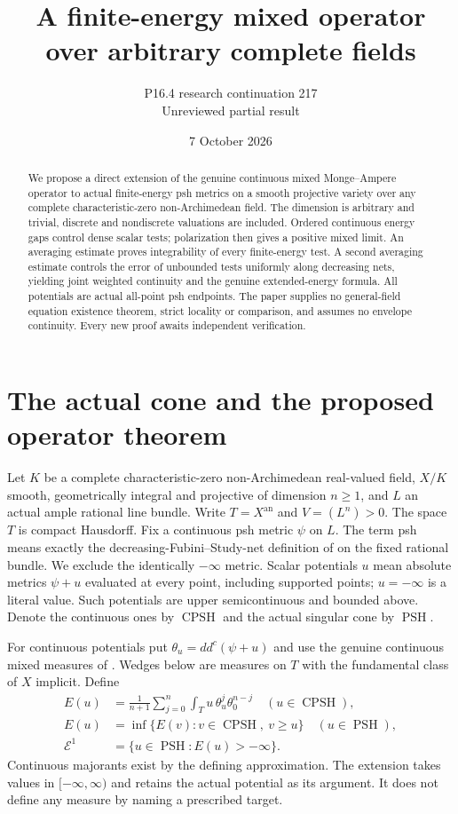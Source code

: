 \documentclass[11pt]{article}
\title{A finite-energy mixed operator\\over arbitrary complete fields}
\author{P16.4 research continuation 217\\Unreviewed partial result}
\date{7 October 2026}
\newcommand{\PSH}{\operatorname{PSH}}
\newcommand{\ddc}{dd^c}
\newcommand{\an}{\mathrm{an}}
\newcommand{\E}{\mathcal E}
\newcommand{\CPSH}{\operatorname{CPSH}}
\begin{document}
\maketitle
\begin{abstract}
We propose a direct extension of the genuine continuous mixed
Monge--Ampere operator to actual finite-energy psh metrics on a smooth
projective variety over any complete characteristic-zero
non-Archimedean field. The dimension is arbitrary and trivial,
discrete and nondiscrete valuations are included. Ordered continuous
energy gaps control dense scalar tests; polarization then gives a
positive mixed limit. An averaging estimate proves integrability of
every finite-energy test. A second averaging estimate controls the
error of unbounded tests uniformly along decreasing nets, yielding
joint weighted continuity and the genuine extended-energy formula.
All potentials are actual all-point psh endpoints. The paper supplies
no general-field equation existence theorem, strict locality or
comparison, and assumes no envelope continuity. Every new proof
awaits independent verification.
\end{abstract}

\section{The actual cone and the proposed operator theorem}

Let $K$ be a complete characteristic-zero non-Archimedean real-valued
field, $X/K$ smooth, geometrically integral and projective of dimension
$n\geq1$, and $L$ an actual ample rational line bundle. Write
$T=X^{\an}$ and $V=(L^n)>0$. The space $T$ is compact Hausdorff.
Fix a continuous psh metric $\psi$ on $L$. The term psh means exactly
the decreasing-Fubini--Study-net definition of
\cite[Definition 7.2]{BE} on the fixed rational bundle. We exclude the
identically $-\infty$ metric. Scalar potentials $u$ mean absolute
metrics $\psi+u$ evaluated at every point, including supported points;
$u=-\infty$ is a literal value. Such potentials are upper
semicontinuous and bounded above. Denote the continuous ones by
$\CPSH$ and the actual singular cone by $\PSH$.

For continuous potentials put $\theta_u=\ddc(\psi+u)$ and use the
genuine continuous mixed measures of \cite[Theorem 8.4]{BE}. Wedges
below are measures on $T$ with the fundamental class of $X$ implicit.
Define
\begin{equation}\label{eq:energy}
 \begin{split}
 E(u)&=\frac1{n+1}\sum_{j=0}^n
             \int_T u\,\theta_u^j\theta_0^{n-j}
                     \quad(u\in\CPSH),\\
 E(u)&=\inf\{E(v):v\in\CPSH,\ v\geq u\}
                     \quad(u\in\PSH),\\
 \E^1&=\{u\in\PSH:E(u)>-\infty\}.
 \end{split}
\end{equation}
Continuous majorants exist by the defining approximation. The
extension takes values in $[-\infty,\infty)$ and retains the actual
potential as its argument. It does not define any measure by naming
a prescribed target.
\end{document}
